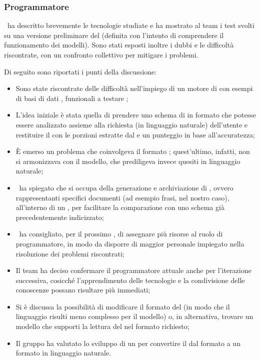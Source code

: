\subsubsection{Programmatore}
\par \marco\ ha descritto brevemente le tecnologie studiate e ha mostrato al team i test svolti su una versione preliminare del  (definita con l'intento di comprendere il funzionamento dei modelli). Sono stati esposti inoltre i dubbi e le difficoltà riscontrate, con un confronto collettivo per mitigare i problemi.
\par Di seguito sono riportati i punti della discussione:
\begin{itemize}
	\item Sono state riscontrate delle difficoltà nell'impiego di un motore di  con esempi di basi di dati , funzionali a testare ;
	\item L'idea iniziale è stata quella di prendere uno schema di  in formato  che potesse essere analizzato assieme alla richiesta (in linguaggio naturale) dell'utente e restituire il  con le porzioni estratte dal  e un punteggio in base all'accuratezza;
	\item È emerso un problema che coinvolgeva il formato ; quest'ultimo, infatti, non si armonizzava con il modello, che prediligeva invece quesiti in linguaggio naturale;
	\item \marco\ ha spiegato che  si occupa della generazione e archiviazione di , ovvero  rappresentanti specifici documenti (ad esempio frasi, nel nostro caso), all'interno di un , per facilitare la comparazione con uno schema già precedentemente indicizzato;
	\item \marco\ ha consigliato, per il prossimo , di assegnare più risorse al ruolo di programmatore, in modo da disporre di maggior personale impiegato nella risoluzione dei problemi riscontrati;
	\item Il team ha deciso confermare il programmatore attuale anche per l’iterazione successiva, cosicché l'apprendimento delle tecnologie e la condivisione delle conoscenze possano risultare più immediati;
	\item Si è discussa la possibilità di modificare il formato del  (in modo che il linguaggio risulti meno complesso per il modello) o, in alternativa, trovare un modello che supporti la lettura del  nel formato richiesto;
	\item Il gruppo ha valutato lo sviluppo di un  per convertire il  dal formato  a un formato in linguaggio naturale.
\end{itemize}

